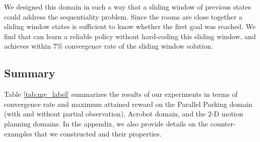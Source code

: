 We designed this domain in such a way that a sliding window of previous states could address the sequentiality problem.
Since the rooms are close together a sliding window states is sufficient to know whether the first goal was reached.
We find that \hirl can learn a reliable policy without hard-coding this sliding window, and achieves within 7\% convergence rate of the sliding window solution.

\subsection{Summary}
Table \ref{tab:my_label} summarizes the results of our experiments in terms of convergence rate and maximum attained reward on the Parallel Parking domain (with and without partial observation), Acrobot domain, and the 2-D motion planning domains.
In the appendix, we also provide details on the counter-examples that we constructed and their properties.

